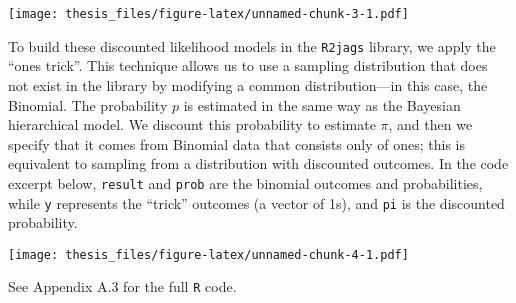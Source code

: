 \documentclass[12pt,twoside]{dukestatscithesis}
\theoremstyle{definition}
\theoremstyle{definition}
\theoremstyle{definition}
\theoremstyle{remark}
\begin{document}
\texttt{[image: thesis\_files/figure-latex/unnamed-chunk-3-1.pdf]}

\pagebreak

To build these discounted likelihood models in the \texttt{R2jags}
library, we apply the ``ones trick''. This technique allows us to use a
sampling distribution that does not exist in the library by modifying a
common distribution---in this case, the Binomial. The probability \(p\)
is estimated in the same way as the Bayesian hierarchical model. We
discount this probability to estimate \(\pi\), and then we specify that
it comes from Binomial data that consists only of ones; this is
equivalent to sampling from a distribution with discounted outcomes. In
the code excerpt below, \texttt{result} and \texttt{prob} are the
binomial outcomes and probabilities, while \texttt{y} represents the
``trick'' outcomes (a vector of 1s), and \texttt{pi} is the discounted
probability.

\texttt{[image: thesis\_files/figure-latex/unnamed-chunk-4-1.pdf]}
\begin{Shaded}
\begin{Highlighting}[]
      
      \StringTok{ }
      
      \StringTok{ }\StringTok{ }
\StringTok{                        }\StringTok{ }
\StringTok{                        }\StringTok{ }
\StringTok{                        }

      \StringTok{ }
      \StringTok{ }\NormalTok{(}
      
      \StringTok{ }\StringTok{ }
      
      \StringTok{ }
      
    \NormalTok{\}}
    
      \StringTok{ }
      \StringTok{ }
      \StringTok{ }
      \StringTok{ }
    \NormalTok{\}}
\end{Highlighting}
\end{Shaded}
See Appendix A.3 for the full \texttt{R} code.
\end{document}
